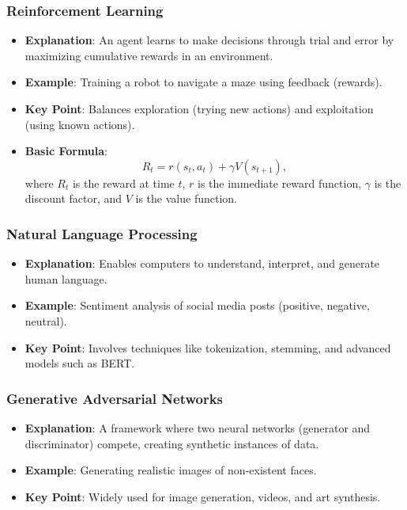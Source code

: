 \documentclass[aspectratio=169]{beamer}
\begin{document}
\begin{frame}[fragile]
    \frametitle{Reinforcement Learning}
    \begin{itemize}
        \item \textbf{Explanation}: An agent learns to make decisions through trial and error by maximizing cumulative rewards in an environment.
        \item \textbf{Example}: Training a robot to navigate a maze using feedback (rewards).
        \item \textbf{Key Point}: Balances exploration (trying new actions) and exploitation (using known actions).
        \item \textbf{Basic Formula}:
        \begin{equation}
            R_t = r(s_t, a_t) + \gamma V(s_{t+1}),
        \end{equation}
        where \( R_t \) is the reward at time \( t \), \( r \) is the immediate reward function, \( \gamma \) is the discount factor, and \( V \) is the value function.
    \end{itemize}
\end{frame}

\begin{frame}[fragile]
    \frametitle{Natural Language Processing}
    \begin{itemize}
        \item \textbf{Explanation}: Enables computers to understand, interpret, and generate human language.
        \item \textbf{Example}: Sentiment analysis of social media posts (positive, negative, neutral).
        \item \textbf{Key Point}: Involves techniques like tokenization, stemming, and advanced models such as BERT.
    \end{itemize}
\end{frame}

\begin{frame}[fragile]
    \frametitle{Generative Adversarial Networks}
    \begin{itemize}
        \item \textbf{Explanation}: A framework where two neural networks (generator and discriminator) compete, creating synthetic instances of data.
        \item \textbf{Example}: Generating realistic images of non-existent faces.
        \item \textbf{Key Point}: Widely used for image generation, videos, and art synthesis.
    \end{itemize}
\end{frame}
\end{document}
